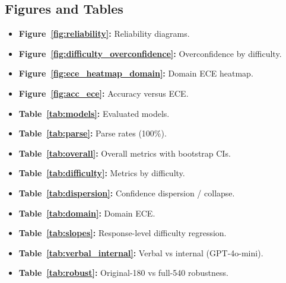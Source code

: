 \documentclass[twoside,twocolumn,10pt]{article}
\begin{document}
\subsection*{Figures and Tables}

\begin{itemize}
    \item \textbf{Figure~\ref{fig:reliability}:} Reliability diagrams.
    \item \textbf{Figure~\ref{fig:difficulty_overconfidence}:} Overconfidence by difficulty.
    \item \textbf{Figure~\ref{fig:ece_heatmap_domain}:} Domain ECE heatmap.
    \item \textbf{Figure~\ref{fig:acc_ece}:} Accuracy versus ECE.
    \item \textbf{Table~\ref{tab:models}:} Evaluated models.
    \item \textbf{Table~\ref{tab:parse}:} Parse rates (100\%).
    \item \textbf{Table~\ref{tab:overall}:} Overall metrics with bootstrap CIs.
    \item \textbf{Table~\ref{tab:difficulty}:} Metrics by difficulty.
    \item \textbf{Table~\ref{tab:dispersion}:} Confidence dispersion / collapse.
    \item \textbf{Table~\ref{tab:domain}:} Domain ECE.
    \item \textbf{Table~\ref{tab:slopes}:} Response-level difficulty regression.
    \item \textbf{Table~\ref{tab:verbal_internal}:} Verbal vs internal (GPT-4o-mini).
    \item \textbf{Table~\ref{tab:robust}:} Original-180 vs full-540 robustness.
\end{itemize}

\renewcommand{\refname}{REFERENCES}
\end{document}

